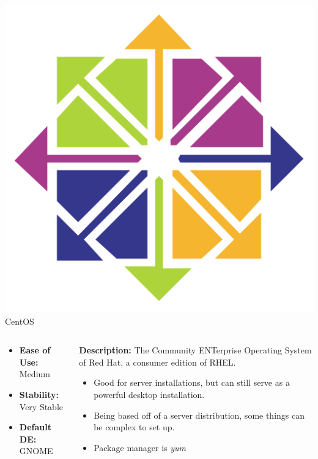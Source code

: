\documentclass[11pt]{beamer}
\begin{document}
\begin{frame}{\includegraphics[scale=0.03]{centos-logo.png} CentOS}
\begin{figure}
	\end{figure}
	\begin{columns}
		\small
		\begin{column}{0.35\textwidth}
			\begin{itemize}
				\item \textbf{Ease of Use:} Medium
				\item \textbf{Stability:} Very Stable
				\item \textbf{Default DE:} GNOME
			\end{itemize}
		\end{column}
		\begin{column}{0.65\textwidth}
			\small
			\textbf{Description:} The Community ENTerprise Operating System of Red Hat, a consumer edition of RHEL.
			\begin{itemize}
				\item Good for server installations, but can still serve as a powerful desktop installation.
				\item Being based off of a server distribution, some things can be complex to set up.
				\item Package manager is \textit{yum}
			\end{itemize}
		\end{column}
	\end{columns}
\end{frame}
\end{document}
